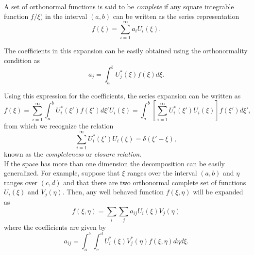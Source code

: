 A set of orthonormal functions is said to be \textit{complete} if any square integrable function $f/\xi )$ in the interval $(a,b)$ can be written as the series representation 
\begin{equation}
f(\xi ) = \sum_{i=1}^\infty a_i U_i (\xi ).
\end{equation}

The coefficients in this expansion can be easily obtained using the orthonormality condition as
\begin{equation}
a_j = \int_a^b U_j^* (\xi ) f(\xi ) d\xi.
\end{equation}

Using this expression for the coefficients, the series expansion can be written as
\begin{equation}
f(\xi ) = \sum_{i=1}^\infty  \int_a^b U_i^* (\xi ') f(\xi' ) d\xi' U_i (\xi ) = \int_a^b \left[  \sum_{i=1}^\infty  U_i^* (\xi ')  U_i (\xi ) \right] f(\xi' ) d\xi'  ,
\end{equation}
from which we recognize the relation
\begin{equation}
 \sum_{i=1}^\infty  U_i^* (\xi ')  U_i (\xi ) = \delta (\xi' - \xi ),
\end{equation}
known as the \textit{completeness} or \textit{closure relation}.\\

If the space has more than one dimension the decomposition can be easily generalized. For example, suppose that $\xi $ ranges over the interval $(a,b)$ and $\eta$ ranges over $(c,d)$ and that there are two orthonormal complete set of functions $U_i(\xi)$ and $V_j(\eta)$. Then, any  well behaved function $f(\xi, \eta)$ will be expanded as
\begin{equation}
f(\xi, \eta) = \sum_i \sum_j a_{ij} U_i(\xi) V_j(\eta)
\end{equation}
where the coefficients are given by
\begin{equation}
a_{ij} = \int_a^b  \int_c^d U_i^* (\xi) V_j^* (\eta) f(\xi, \eta)  d\eta d\xi.
\end{equation}

